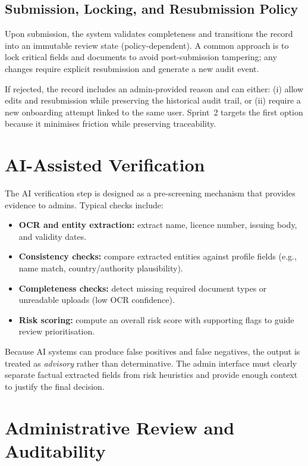 \subsection{Submission, Locking, and Resubmission Policy}
Upon submission, the system validates completeness and transitions the record
into an immutable review state (policy-dependent). A common approach is to lock
critical fields and documents to avoid post-submission tampering; any changes
require explicit resubmission and generate a new audit event.

If rejected, the record includes an admin-provided reason and can either:
(i) allow edits and resubmission while preserving the historical audit trail, or
(ii) require a new onboarding attempt linked to the same user. Sprint~2 targets
the first option because it minimises friction while preserving traceability.

\section{AI-Assisted Verification}
\label{sec:sprint2-ai}

The AI verification step is designed as a pre-screening mechanism that provides
evidence to admins. Typical checks include:

\begin{itemize}
    \item \textbf{OCR and entity extraction:} extract name, licence number,
    issuing body, and validity dates.
    \item \textbf{Consistency checks:} compare extracted entities against
    profile fields (e.g., name match, country/authority plausibility).
    \item \textbf{Completeness checks:} detect missing required document types
    or unreadable uploads (low OCR confidence).
    \item \textbf{Risk scoring:} compute an overall risk score with supporting
    flags to guide review prioritisation.
\end{itemize}

Because AI systems can produce false positives and false negatives, the output
is treated as \emph{advisory} rather than determinative. The admin interface
must clearly separate factual extracted fields from risk heuristics and provide
enough context to justify the final decision.

\section{Administrative Review and Auditability}
\label{sec:sprint2-admin}


